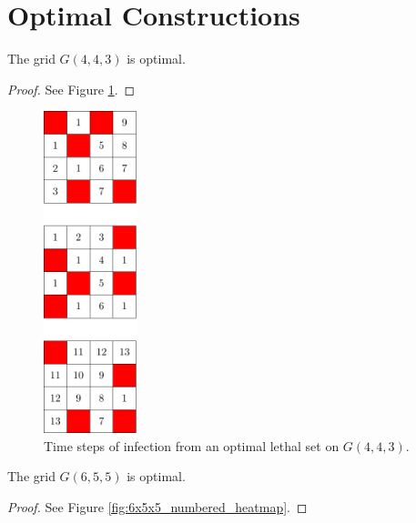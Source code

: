 \newpage

\section{Optimal Constructions}

\begin{con}
\label{con:4x4x3}
The grid $G(4,4,3)$ is optimal.
\end{con}

\begin{proof}
See Figure \ref{fig:4x4x3_numbered_heatmap}.
\end{proof}

\begin{figure}[H]
\centering
\includegraphics[width=0.24\textwidth]{figures/A/4x4x3_numbered_heatmap.pdf}
\caption{Time steps of infection from an optimal lethal set on $G(4,4,3)$.}
\label{fig:4x4x3_numbered_heatmap}
\end{figure}

\newpage

\begin{con}
\label{con:6x5x5}
The grid $G(6,5,5)$ is optimal.
\end{con}

\begin{proof}
See Figure \ref{fig:6x5x5_numbered_heatmap}.
\end{proof}

